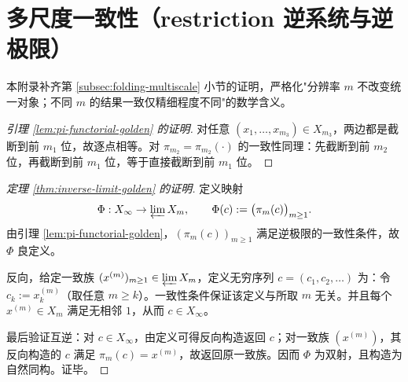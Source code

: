\section{多尺度一致性（restriction 逆系统与逆极限）}\label{app:multiscale-inverse-limit}

本附录补齐第 \ref{subsec:folding-multiscale} 小节的证明，严格化"分辨率 $m$ 不改变统一对象；不同 $m$ 的结果一致仅精细程度不同"的数学含义。

\begin{proof}[引理 \ref{lem:pi-functorial-golden} 的证明]
对任意 $(x_1,\dots,x_{m_3})\in X_{m_3}$，两边都是截断到前 $m_1$ 位，故逐点相等。对 $\pi_{m_2}=\pi_{m_2}(\cdot)$ 的一致性同理：先截断到前 $m_2$ 位，再截断到前 $m_1$ 位，等于直接截断到前 $m_1$ 位。
\end{proof}

\begin{proof}[定理 \ref{thm:inverse-limit-golden} 的证明]
定义映射
\[
\Phi:X_\infty\to \varprojlim X_m,\qquad
\Phi(c):=\bigl(\pi_m(c)\bigr)_{m\ge 1}.
\]
由引理 \ref{lem:pi-functorial-golden}，$(\pi_m(c))_{m\ge 1}$ 满足逆极限的一致性条件，故 $\Phi$ 良定义。

反向，给定一致族 $(x^{(m)})_{m\ge 1}\in\varprojlim X_m$，定义无穷序列 $c=(c_1,c_2,\dots)$ 为：令 $c_k:=x^{(m)}_k$（取任意 $m\ge k$）。一致性条件保证该定义与所取 $m$ 无关。并且每个 $x^{(m)}\in X_m$ 满足无相邻 $1$，从而 $c\in X_\infty$。

最后验证互逆：对 $c\in X_\infty$，由定义可得反向构造返回 $c$；对一致族 $(x^{(m)})$，其反向构造的 $c$ 满足 $\pi_m(c)=x^{(m)}$，故返回原一致族。因而 $\Phi$ 为双射，且构造为自然同构。证毕。
\end{proof}
